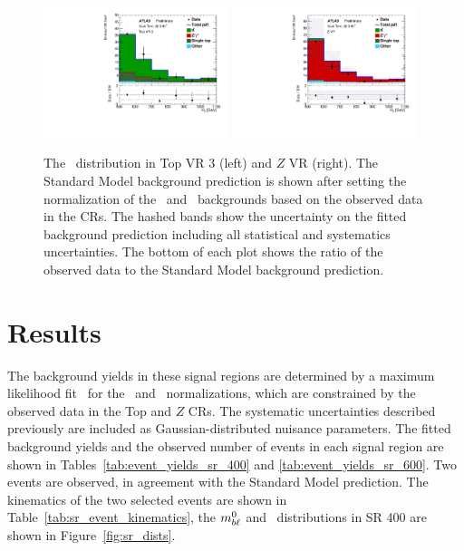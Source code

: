 \begin{figure}
  \centering
  \includegraphics[width=0.48\textwidth]{figs/blstop/vr_top_3_ht_signal.pdf}
  \includegraphics[width=0.48\textwidth]{figs/blstop/vr_Z_ht_signal.pdf}
  \caption{The \HT\ distribution in Top VR 3 (left) and $Z$ VR (right).
    The Standard Model background prediction is shown after setting the
    normalization of the \TTBAR\ and \ZGAMMAJETS\ backgrounds based on the
    observed data in the CRs.
    The hashed bands show the uncertainty on the fitted background prediction
    including all statistical and systematics uncertainties.
    The bottom of each plot shows the ratio of the observed data to the
    Standard Model background prediction.
  }
  \label{fig:ht_vr}
\end{figure}

\section{Results}
\label{sec:results}

The background yields in these signal regions are determined by a maximum
likelihood fit~\cite{Baak:2014wma} for the \TTBAR\ and
\ZGAMMAJETS\ normalizations, which are constrained by the observed data in the
Top and $Z$ CRs.
The systematic uncertainties described previously are included as
Gaussian-distributed nuisance parameters.
The fitted background yields and the observed number of events in each
signal region are shown in Tables~\ref{tab:event_yields_sr_400} and
\ref{tab:event_yields_sr_600}. Two events are observed, in agreement with
the Standard Model prediction.  The kinematics of the two selected events
are shown in Table~\ref{tab:sr_event_kinematics}, the $m_{b\ell}^0$ and
\HT\ distributions in SR 400 are shown in Figure~\ref{fig:sr_dists}.

